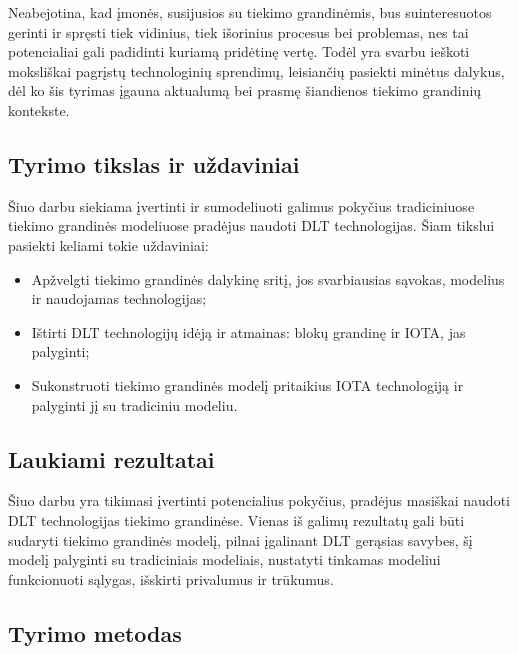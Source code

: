 \documentclass{VUMIFPSkursinis}
\begin{document}
Neabejotina, kad įmonės, susijusios su tiekimo grandinėmis, bus suinteresuotos gerinti ir spręsti tiek vidinius, tiek išorinius procesus bei problemas, nes tai potencialiai gali padidinti kuriamą pridėtinę vertę. Todėl yra svarbu ieškoti moksliškai pagrįstų technologinių sprendimų, leisiančių pasiekti minėtus dalykus, dėl ko šis tyrimas įgauna aktualumą bei prasmę šiandienos tiekimo grandinių kontekste.

\subsection{Tyrimo tikslas ir uždaviniai}

Šiuo darbu siekiama įvertinti ir sumodeliuoti galimus pokyčius tradiciniuose tiekimo grandinės modeliuose pradėjus naudoti DLT technologijas.
Šiam tikslui pasiekti keliami tokie uždaviniai:


\begin{itemize}
    \item Apžvelgti tiekimo grandinės dalykinę sritį, jos svarbiausias sąvokas, modelius ir naudojamas technologijas;
    \item Ištirti DLT technologijų idėją ir atmainas: blokų grandinę ir IOTA, jas palyginti;
    \item Sukonstruoti tiekimo grandinės modelį pritaikius IOTA technologiją ir palyginti jį su tradiciniu modeliu.
\end{itemize}

\subsection{Laukiami rezultatai}

Šiuo darbu yra tikimasi įvertinti potencialius pokyčius, pradėjus masiškai naudoti DLT technologijas tiekimo grandinėse. Vienas iš galimų rezultatų gali būti sudaryti tiekimo grandinės modelį, pilnai įgalinant DLT gerąsias savybes, šį modelį palyginti su tradiciniais modeliais, nustatyti tinkamas modeliui funkcionuoti sąlygas, išskirti privalumus ir trūkumus. 

\subsection{Tyrimo metodas}
\end{document}
